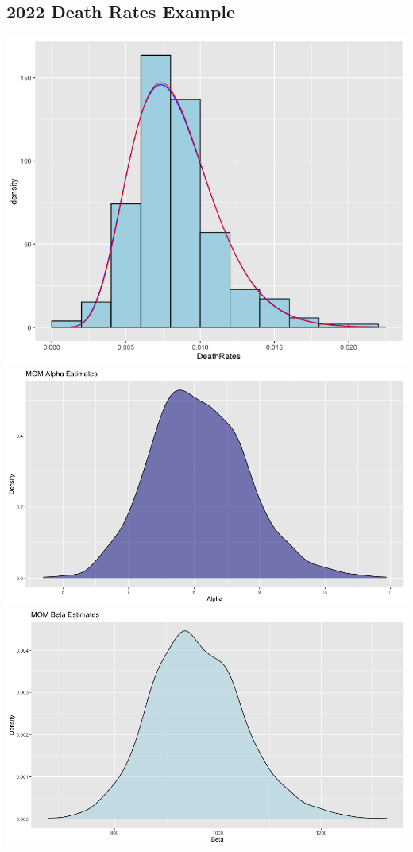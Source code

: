\documentclass{article}\usepackage[]{graphicx}\usepackage[]{xcolor}
\begin{document}
\subsection{2022 Death Rates Example}
\includegraphics[scale=0.6]{Histogram of Data with distributions super imposed.png}\\
\includegraphics[scale=0.25]{MOM ALPHA DENSITY.png}
\includegraphics[scale=0.25]{MOM BETA DENSITY.png}\\
\end{document}

